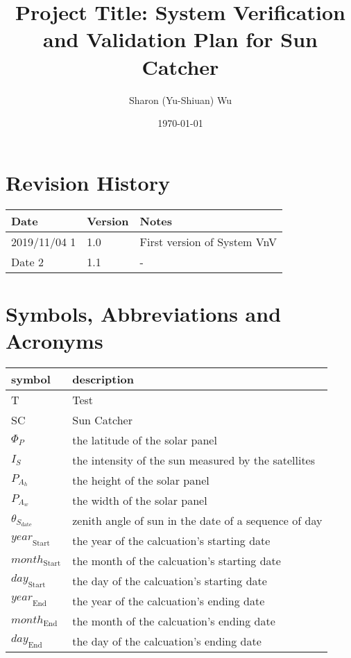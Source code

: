\documentclass[12pt, titlepage]{article}
\begin{document}
\title{Project Title: System Verification and Validation Plan for Sun Catcher}

\author{Sharon (Yu-Shiuan) Wu} \date{\today} \maketitle
{}

\section{Revision History}

\begin{tabularx}{\textwidth}{p{3cm}p{2cm}X}
\toprule {\bf Date} & {\bf Version} & {\bf Notes}\\ 
\midrule 
2019/11/04 1 & 1.0 & First version of System VnV\\ 
Date 2 & 1.1 & -\\ 
\bottomrule 
\end{tabularx} \newpage
\tableofcontents

\listoftables

\listoffigures

\newpage

\section{Symbols, Abbreviations and Acronyms}

\renewcommand{\arraystretch}{1.2}
\begin{tabular}{l l} \toprule \textbf{symbol} & \textbf{description}\\
 \midrule T & Test\\ 
SC & Sun Catcher\\ 
$\Phi_P$ & the latitude of the solar panel \\ 
$I_{S}$ &  the intensity of the sun measured by the satellites \\ 
$P_{A_{h}}$ & the height of the solar panel \\ 
$P_{A_{w}}$ & the width of the solar panel \\
$\theta_{S_{\text{date}}}$ & zenith angle of
sun in the date of a sequence of day
  \\ 
$\mathit{year}_\text{Start}$ & the year of the calcuation's starting date\\ 
$\mathit{month}_\text{Start}$ & the month of the calcuation's starting date\\ 
$\mathit{day}_\text{Start}$ & the day of the calcuation's starting date\\ 
$\mathit{year}_\text{End}$ & the year of the calcuation's ending date\\ 
$\mathit{month}_\text{End}$ & the month of the calcuation's ending date\\ 
$\mathit{day}_\text{End}$ & the day of the calcuation's ending date\\ 
\bottomrule
\end{tabular}\\ 
\end{document}
